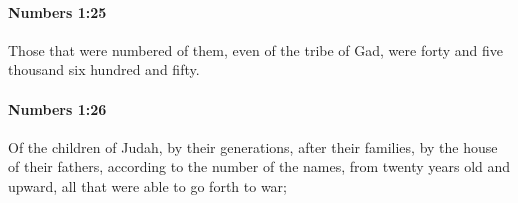 		\paragraph{Numbers 1:25} %
			\label{NUMBERS-1-25}

			Those that were numbered of them, even of the tribe of Gad, were forty and five thousand six hundred and fifty.


		\paragraph{Numbers 1:26} %
			\label{NUMBERS-1-26}

			Of the children of Judah, by their generations, after their families, by the house of their fathers, according to the number of the names, from twenty years old and upward, all that were able to go forth to war;


